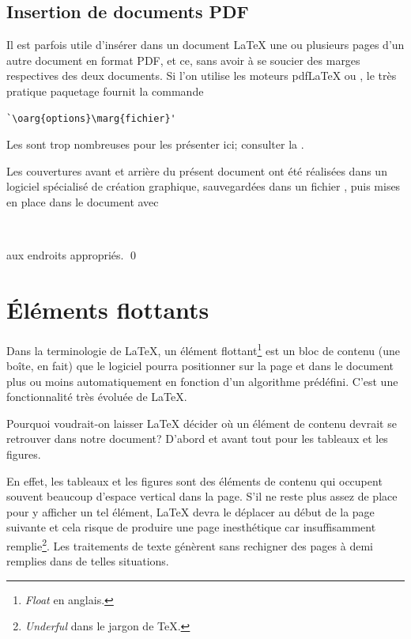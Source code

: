 \subsection{Insertion de documents PDF}
\label{sec:tableaux:figures:pdfpages}

Il est parfois utile d'insérer dans un document {\LaTeX} une ou
plusieurs pages d'un autre document en format PDF, et ce, sans avoir à
se soucier des marges respectives des deux documents. Si l'on utilise
les moteurs pdf{\LaTeX} ou {\XeLaTeX}, le très pratique paquetage
 \citep{pdfpages} fournit la commande
\begin{lstlisting}
`\oarg{options}\marg{fichier}'
\end{lstlisting}
Les  sont trop nombreuses pour les présenter ici;
consulter la %
.

\begin{exemple}
  Les couvertures avant et arrière du présent document ont été
  réalisées dans un logiciel spécialisé de création graphique,
  sauvegardées dans un fichier , puis mises
  en place dans le document avec
\begin{lstlisting}


\end{lstlisting}
  aux endroits appropriés.
  \qed
\end{exemple}



\section{Éléments flottants}
\label{sec:tableaux:floats}

Dans la terminologie de {\LaTeX}, un élément flottant\footnote{%
  \emph{Float} en anglais.} %
est un bloc de contenu (une boîte, en fait) que le logiciel pourra
positionner sur la page et dans le document plus ou moins
automatiquement en fonction d'un algorithme prédéfini. C'est une
fonctionnalité très évoluée de {\LaTeX}.

Pourquoi voudrait-on laisser {\LaTeX} décider où un élément de contenu
devrait se retrouver dans notre document? D'abord et avant tout pour
les tableaux et les figures.

En effet, les tableaux et les figures sont des éléments de contenu qui occupent
souvent beaucoup d'espace vertical dans la page. S'il ne reste plus
assez de place pour y afficher un tel élément, {\LaTeX} devra
le déplacer au début de la page suivante et cela risque de produire une
page inesthétique car insuffisamment remplie\footnote{%
  \emph{Underful } dans le jargon de {\TeX}.}. %
Les traitements de texte génèrent sans rechigner des pages
à demi remplies dans de telles situations.

